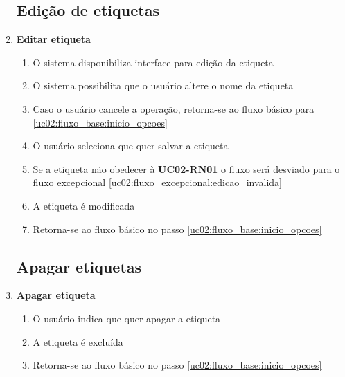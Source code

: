 \documentclass[
	12pt,				%
	oneside,			%
	a4paper,			%
	english,			%
	brazil,				%
	]{abntex2}
\begin{document}
\begin{enumerate}[label=\textbf{UC02-FA{\arabic*}},font=\normalsize]
    \subsection{Edição de etiquetas}
    \item \textbf{\normalsize Editar etiqueta} \label{uc02:fluxo_alternativo:editar_etiqueta}
    \begin{enumerate}[label={\arabic*}.]
        \item O sistema disponibiliza interface para edição da etiqueta \label{uc02:fluxo_alternativo:editar_etiqueta:pode_escrever}
        \item O sistema possibilita que o usuário altere o nome da etiqueta
        \item Caso o usuário cancele a operação, retorna-se ao fluxo básico para \ref{uc02:fluxo_base:inicio_opcoes}
        \item O usuário seleciona que quer salvar a etiqueta
        \item Se a etiqueta não obedecer à \textbf{\hyperref[uc02:rn01_validar]{UC02-RN01}} o fluxo será desviado para o fluxo excepcional \ref{uc02:fluxo_excepcional:edicao_invalida}
        \item A etiqueta é modificada
        \item Retorna-se ao fluxo básico no passo \ref{uc02:fluxo_base:inicio_opcoes}
    \end{enumerate}
    \subsection{Apagar etiquetas}
       \item \textbf{\normalsize Apagar etiqueta} \label{uc02:fluxo_alternativo:apagar_etiqueta}
    \begin{enumerate}[label={\arabic*}.]
        \item O usuário indica que quer apagar a etiqueta
        \item A etiqueta é excluída
        \item Retorna-se ao fluxo básico no passo \ref{uc02:fluxo_base:inicio_opcoes}
    \end{enumerate}
\end{enumerate}
\end{document}
